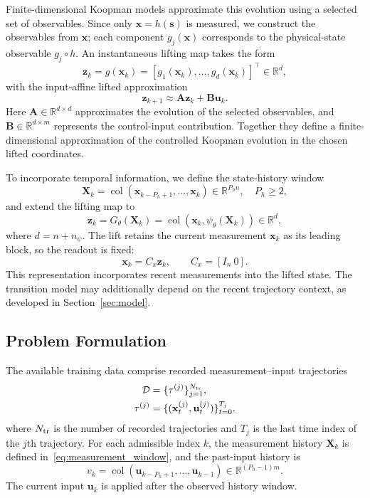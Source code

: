 \documentclass[journal]{IEEEtran}
\newcommand{\vx}{\mathbf{x}}
\newcommand{\vu}{\mathbf{u}}
\newcommand{\vs}{\mathbf{s}}
\newcommand{\vz}{\mathbf{z}}
\newcommand{\mA}{\mathbf{A}}
\newcommand{\mB}{\mathbf{B}}
\newcommand{\mX}{\mathbf{X}}
\newcommand{\R}{\mathbb{R}}
\newcommand{\col}{\operatorname{col}}
\begin{document}
Finite-dimensional Koopman models approximate this evolution using a selected set of observables. Since only $\vx=h(\vs)$ is measured, we construct the observables from $\vx$; each component $g_j(\vx)$ corresponds to the physical-state observable $g_j\circ h$. An instantaneous lifting map takes the form
\begin{equation}
\vz_k=g(\vx_k)=[g_1(\vx_k),\ldots,g_d(\vx_k)]^\top\in\R^d,
\label{eq:instantaneous_lifting}
\end{equation}
with the input-affine lifted approximation
\begin{equation}
\vz_{k+1}\approx\mA\vz_k+\mB\vu_k.
\label{eq:linear_lifted}
\end{equation}
Here $\mA\in\R^{d\times d}$ approximates the evolution of the selected observables, and $\mB\in\R^{d\times m}$ represents the control-input contribution. Together they define a finite-dimensional approximation of the controlled Koopman evolution in the chosen lifted coordinates.

To incorporate temporal information, we define the state-history window
\begin{equation}
\mX_k=\col(\vx_{k-P_h+1},\ldots,\vx_k)\in\R^{P_h n},\quad P_h\ge2,
\label{eq:measurement_window}
\end{equation}
and extend the lifting map to
\begin{equation}
\vz_k=G_\theta(\mX_k)=\col(\vx_k,\psi_\theta(\mX_k))\in\R^d,
\label{eq:state_preserving_lifting}
\end{equation}
where $d=n+n_\psi$. The lift retains the current measurement $\vx_k$ as its leading block, so the readout is fixed:
\begin{equation}
\vx_k=C_x\vz_k,\qquad C_x=[I_n\ 0].
\label{eq:state_readout}
\end{equation}
This representation incorporates recent measurements into the lifted state. The transition model may additionally depend on the recent trajectory context, as developed in Section~\ref{sec:model}.

\subsection{Problem Formulation}
\label{sec:problem}
The available training data comprise recorded measurement--input trajectories
\begin{equation}
\begin{aligned}
\mathcal D &= \{\tau^{(j)}\}_{j=1}^{N_{\rm tr}},\\
\tau^{(j)} &= \{(\vx_t^{(j)},\vu_t^{(j)})\}_{t=0}^{T_j},
\end{aligned}
\label{eq:training_data}
\end{equation}
where $N_{\rm tr}$ is the number of recorded trajectories and $T_j$ is the last time index of the $j$th trajectory.
For each admissible index $k$, the measurement history $\mX_k$ is defined in~\eqref{eq:measurement_window}, and the past-input history is
\begin{equation}
v_k = \col(\vu_{k-P_h+1},\ldots,\vu_{k-1}) \in \R^{(P_h-1)m}.
\label{eq:past_input_history}
\end{equation}
The current input $\vu_k$ is applied after the observed history window.
\end{document}
